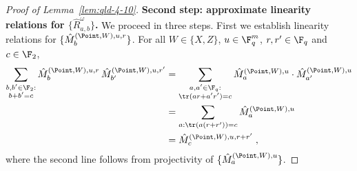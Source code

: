 \begin{proof}[Proof of Lemma~\ref{lem:qld-4-10}]
	\textbf{Second step: approximate linearity relations for $\{ \hat{R}^\omega_{a,b} \}$.}
	We proceed in three steps. First we establish linearity relations for $\{ \hat{M}^{(\Point,W),u,r}_b \}$. For all $W \in \{X,Z\}$, $u \in \F_q^m$, $r, r' \in \F_q$ and $c \in \F_2$, 
	\begin{align}
		\sum_{\substack{b,b' \in \F_2 : \\ b + b' = c }} \hat{M}^{(\Point,W),u,r}_b \, \hat{M}^{(\Point,W),u,r'}_{b'} &= \sum_{\substack{a,a' \in \F_q: \\ \tr(ar + a'r') = c}} \hat{M}^{(\Point,W),u}_a \cdot \hat{M}^{(\Point,W),u}_{a'} \notag\\
		&= \sum_{a : \tr(a (r +r')) = c } \hat{M}^{(\Point,W),u}_a \notag\\
		&= \hat{M}^{(\Point,W),u,r+r'}_c\;,\label{eq:m-lin}
	\end{align}
	where the second line follows from projectivity of $\{\hat{M}^{(\Point,W),u}_a\}$. 
	

\end{proof}
